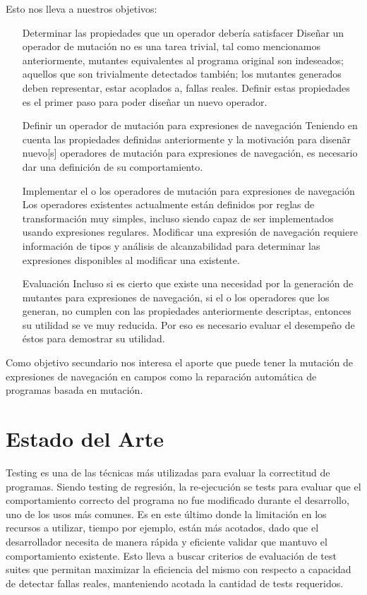 Esto nos lleva a nuestros objetivos:

\begin{enumerate}[leftmargin=.75cm,align=left]
	\item[Determinar las propiedades que un operador deber\'ia satisfacer]
	Dise\~nar un operador de mutaci\'on no es una tarea trivial, tal como mencionamos anteriormente, mutantes equivalentes al programa original son indeseados; aquellos que son trivialmente detectados tambi\'en; los mutantes generados deben representar, estar acoplados a, fallas reales. Definir estas propiedades es el primer paso para poder dise\~nar un nuevo operador.
	\item[Definir un operador de mutaci\'on para expresiones de navegaci\'on]
	Teniendo en cuenta las propiedades definidas anteriormente y la motivaci\'on para disen\~ar nuevo[s] operadores de mutaci\'on para expresiones de navegaci\'on, es necesario dar una definici\'on de su comportamiento.
	\item[Implementar el o los operadores de mutaci\'on para expresiones de navegaci\'on] 
	Los operadores existentes actualmente est\'an definidos por reglas de transformaci\'on muy simples, incluso siendo capaz de ser implementados usando expresiones regulares. Modificar una expresi\'on de navegaci\'on requiere informaci\'on de tipos y an\'alisis de alcanzabilidad para determinar las expresiones disponibles al modificar una existente.
	\item[Evaluaci\'on]
	Incluso si es cierto que existe una necesidad por la generaci\'on de mutantes para expresiones de navegaci\'on, si el o los operadores que los generan, no cumplen con las propiedades anteriormente descriptas, entonces su utilidad se ve muy reducida. Por eso es necesario evaluar el desempe\~no de \'estos para demostrar su utilidad.
\end{enumerate}

Como objetivo secundario nos interesa el aporte que puede tener la mutaci\'on de expresiones de navegaci\'on en campos como la reparaci\'on autom\'atica de programas basada en mutaci\'on.


\section{Estado del Arte}
\label{sec:intro.estado-del-arte}

Testing es una de las t\'ecnicas m\'as utilizadas para evaluar la correctitud de programas. Siendo testing de regresi\'on, la re-ejecuci\'on se tests para evaluar que el comportamiento correcto del programa no fue modificado durante el desarrollo, uno de los usos m\'as comunes. Es en este \'ultimo donde la limitaci\'on en los recursos a utilizar, tiempo por ejemplo, est\'an m\'as acotados, dado que el desarrollador necesita de manera r\'apida y eficiente validar que mantuvo el comportamiento existente. Esto lleva a buscar criterios de evaluaci\'on de test suites que permitan maximizar la eficiencia del mismo con respecto a capacidad de detectar fallas reales, manteniendo acotada la cantidad de tests requeridos.

